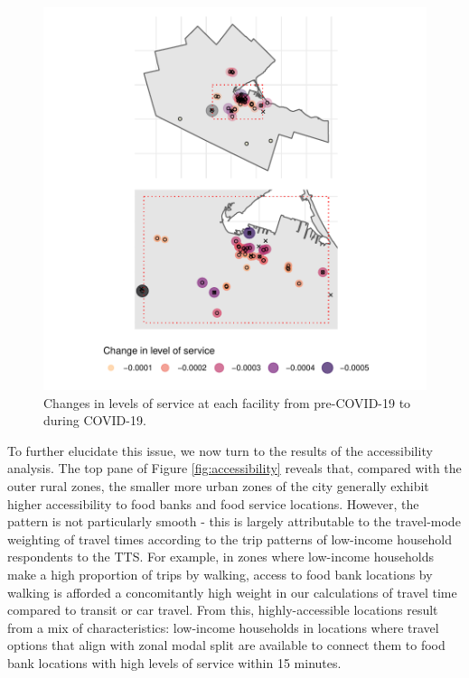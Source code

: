 \documentclass[]{elsarticle} %
\begin{document}
\begin{figure}
\includegraphics[width=1\linewidth]{Accessibility-Foodbanks-Hamilton_files/figure-latex/plot-levels-of-service-changes-1} \caption{\label{fig:levels-of-service-changes}Changes in levels of service at each facility from pre-COVID-19 to during COVID-19.}\label{fig:plot-levels-of-service-changes}
\end{figure}

To further elucidate this issue, we now turn to the results of the
accessibility analysis. The top pane of Figure \ref{fig:accessibility}
reveals that, compared with the outer rural zones, the smaller more
urban zones of the city generally exhibit higher accessibility to food
banks and food service locations. However, the pattern is not
particularly smooth - this is largely attributable to the travel-mode
weighting of travel times according to the trip patterns of low-income
household respondents to the TTS. For example, in zones where low-income
households make a high proportion of trips by walking, access to food
bank locations by walking is afforded a concomitantly high weight in our
calculations of travel time compared to transit or car travel. From
this, highly-accessible locations result from a mix of characteristics:
low-income households in locations where travel options that align with
zonal modal split are available to connect them to food bank locations
with high levels of service within 15 minutes.
\end{document}
